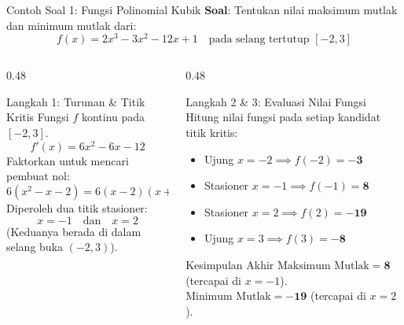 \documentclass[aspectratio=169,10pt]{beamer}
\begin{document}
\begin{frame}{Contoh Soal 1: Fungsi Polinomial Kubik}
    \textbf{Soal}: Tentukan nilai maksimum mutlak dan minimum mutlak dari:
    \[
        f(x) = 2x^3 - 3x^2 - 12x + 1 \quad \text{pada selang tertutup } [-2, 3]
    \]

    \pause
    \begin{columns}[T]
        \begin{column}{0.48\textwidth}
            \begin{block}{Langkah 1: Turunan \& Titik Kritis}
                Fungsi $f$ kontinu pada $[-2, 3]$.
                \[
                    f'(x) = 6x^2 - 6x - 12
                \]
                Faktorkan untuk mencari pembuat nol:
                \[
                    6(x^2 - x - 2) = 6(x - 2)(x + 1) = 0
                \]
                Diperoleh dua titik stasioner:
                \[
                    x = -1 \quad \text{dan} \quad x = 2
                \]
                {\scriptsize \color{SoftGray} (Keduanya berada di dalam selang buka $(-2, 3)$).}
            \end{block}
        \end{column}

        \begin{column}{0.48\textwidth}
            \begin{exampleblock}{Langkah 2 \& 3: Evaluasi Nilai Fungsi}
                Hitung nilai fungsi pada setiap kandidat titik kritis:
                \begin{itemize}
                    \item Ujung $x = -2 \implies f(-2) = \mathbf{-3}$
                    \item Stasioner $x = -1 \implies f(-1) = \mathbf{8}$
                    \item Stasioner $x = 2 \implies f(2) = \mathbf{-19}$
                    \item Ujung $x = 3 \implies f(3) = \mathbf{-8}$
                \end{itemize}
            \end{exampleblock}

            \begin{alertblock}{Kesimpulan Akhir}
                $\text{Maksimum Mutlak} = \mathbf{8}$ (tercapai di $x = -1$).\\
                $\text{Minimum Mutlak} = \mathbf{-19}$ (tercapai di $x = 2$).
            \end{alertblock}
        \end{column}
    \end{columns}
\end{frame}
\end{document}
